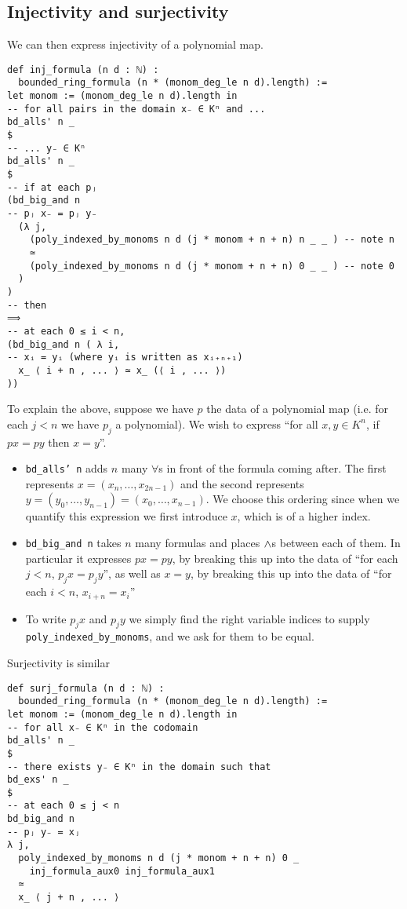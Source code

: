 \subsection{Injectivity and surjectivity}

We can then express injectivity of a polynomial map.

\begin{lstlisting}
def inj_formula (n d : ℕ) :
  bounded_ring_formula (n * (monom_deg_le n d).length) :=
let monom := (monom_deg_le n d).length in
-- for all pairs in the domain x₋ ∈ Kⁿ and ...
bd_alls' n _
$
-- ... y₋ ∈ Kⁿ
bd_alls' n _
$
-- if at each pⱼ
(bd_big_and n
-- pⱼ x₋ = pⱼ y₋
  (λ j,
    (poly_indexed_by_monoms n d (j * monom + n + n) n _ _ ) -- note n
    ≃
    (poly_indexed_by_monoms n d (j * monom + n + n) 0 _ _ ) -- note 0
  )
)
-- then
⟹
-- at each 0 ≤ i < n,
(bd_big_and n ( λ i,
-- xᵢ = yᵢ (where yᵢ is written as xᵢ₊ₙ₊₁)
  x_ ⟨ i + n , ... ⟩ ≃ x_ (⟨ i , ... ⟩)
))
\end{lstlisting}

To explain the above, suppose we have $p$ the data of a polynomial map
(i.e. for each $j < n$ we have $p_j$ a polynomial).
We wish to express ``for all $x,y \in K^{n}$,
if $p x = p y$ then $x = y$''.
\begin{itemize}
  \item \texttt{bd\_alls' n} adds $n$ many $\forall$s in front of the
        formula coming after.
        The first represents $x = (x_{n},\dots,x_{2n-1})$ and the second represents
        $y = (y_{0},\dots,y_{n-1}) = (x_{0},\dots,x_{n-1})$.
        We choose this ordering since when we quantify this expression
        we first introduce $x$, which is of a higher index.
  \item \texttt{bd\_big\_and n} takes $n$ many formulas and places $\land$s between
        each of them. In particular it expresses $p x = p y$, by breaking this up
        into the data of ``for each $j < n$, $p_{j} x = p_{j} y$'',
        as well as $x = y$, by breaking this up into the data of ``for each $i < n$,
        $x_{i+n} = x_{i}$''
  \item To write $p_{j} x$ and $p_{j} y$ we simply find the right variable indices
        to supply \texttt{poly\_indexed\_by\_monoms},
        and we ask for them to be equal.
\end{itemize}

Surjectivity is similar

\begin{lstlisting}
def surj_formula (n d : ℕ) :
  bounded_ring_formula (n * (monom_deg_le n d).length) :=
let monom := (monom_deg_le n d).length in
-- for all x₋ ∈ Kⁿ in the codomain
bd_alls' n _
$
-- there exists y₋ ∈ Kⁿ in the domain such that
bd_exs' n _
$
-- at each 0 ≤ j < n
bd_big_and n
-- pⱼ y₋ = xⱼ
λ j,
  poly_indexed_by_monoms n d (j * monom + n + n) 0 _
    inj_formula_aux0 inj_formula_aux1
  ≃
  x_ ⟨ j + n , ... ⟩ \end{lstlisting}

